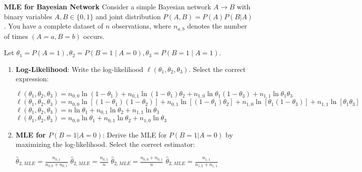 \documentclass[12pt,letterpaper, onecolumn]{exam}
\begin{document}
\begin{questions}
\question[20 points]\textbf{MLE for Bayesian Network}\droppoints
Consider a simple Bayesian network \( A \to B \) with binary variables \( A, B \in \{0, 1\} \) and joint distribution \( P(A, B) = P(A) P(B | A) \). You have a complete dataset of \( n \) observations, where \( n_{a,b} \) denotes the number of times \( (A=a, B=b) \) occurs.

Let $\theta_1 = P(A=1), \theta_2 = P(B=1\mid A=0), \theta_3 = P(B=1\mid A=1)$.

\begin{enumerate}[label=(\alph*)]
    \item \textbf{Log-Likelihood}: Write the log-likelihood \( \ell(\theta_1, \theta_2, \theta_3) \). Select the correct expression: 
    \begin{choices}
        \choice \( \ell(\theta_1, \theta_2, \theta_3) = n_{0,0} \ln(1 - \theta_1) + n_{0,1} \ln(1 - \theta_1) \theta_2 + n_{1,0} \ln \theta_1 (1 - \theta_3) + n_{1,1} \ln \theta_1 \theta_3 \)
        \choice \( \ell(\theta_1, \theta_2, \theta_3) = n_{0,0} \ln [ (1 - \theta_1) (1 - \theta_2) ] + n_{0,1} \ln [ (1 - \theta_1) \theta_2 ] + n_{1,0} \ln [ \theta_1 (1 - \theta_3) ] + n_{1,1} \ln [ \theta_1 \theta_3 ] \)
        \choice \( \ell(\theta_1, \theta_2, \theta_3) = n \ln \theta_1 + n_{0,1} \ln \theta_2 + n_{1,1} \ln \theta_3 \)
        \choice \( \ell(\theta_1, \theta_2, \theta_3) = n_{0,0} \ln \theta_1 + n_{0,1} \ln \theta_2 + n_{1,0} \ln \theta_3 \)
    \end{choices}

    \item \textbf{MLE for \( P(B=1|A=0) \)}: Derive the MLE for \( P(B=1|A=0) \) by maximizing the log-likelihood. Select the correct estimator: 
    \begin{choices}
        \choice \( \hat{\theta}_{2, MLE} = \frac{n_{0,1}}{n_{0,0} + n_{0,1}} \)
        \choice \( \hat{\theta}_{2, MLE} = \frac{n_{0,1}}{n} \)
        \choice \( \hat{\theta}_{2, MLE} = \frac{n_{0,0} + n_{0,1}}{n} \)
        \choice \( \hat{\theta}_{2, MLE} = \frac{n_{1,1}}{n_{1,0} + n_{1,1}} \)
    \end{choices}
\end{enumerate}

\begin{solution}
    \begin{parts}
        \part 
        \part 
    \end{parts}
\end{solution}


\end{questions}
\end{document}
